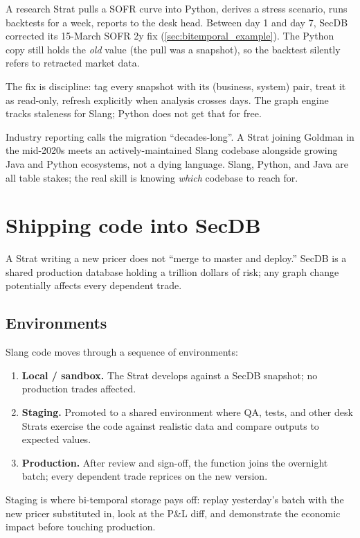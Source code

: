 \begin{pitfallbox}
A research Strat pulls a SOFR curve into Python, derives a stress
scenario, runs backtests for a week, reports to the desk head.
Between day 1 and day 7, SecDB corrected its 15-March SOFR 2y fix
(\cref{sec:bitemporal_example}).  The Python copy still holds the
\emph{old} value (the pull was a snapshot), so the backtest
silently refers to retracted market data.

The fix is discipline: tag every snapshot with its (business,
system) pair, treat it as read-only, refresh explicitly when
analysis crosses days.  The graph engine tracks staleness for
Slang; Python does not get that for free.
\end{pitfallbox}

Industry reporting calls the migration ``decades-long''.  A Strat
joining Goldman in the mid-2020s meets an actively-maintained
Slang codebase alongside growing Java and Python ecosystems, not
a dying language.  Slang, Python, and Java are all table stakes;
the real skill is knowing \emph{which} codebase to reach for.


\section{Shipping code into SecDB}
\label{sec:shipping}

A Strat writing a new pricer does not ``merge to master and
deploy.''  SecDB is a shared production database holding a
trillion dollars of risk; any graph change potentially affects
every dependent trade.

\subsection{Environments}

Slang code moves through a sequence of environments:
\begin{enumerate}
  \item \textbf{Local / sandbox.}  The Strat develops against a
    SecDB snapshot; no production trades affected.
  \item \textbf{Staging.}  Promoted to a shared environment where
    QA, tests, and other desk Strats exercise the code against
    realistic data and compare outputs to expected values.
  \item \textbf{Production.}  After review and sign-off, the
    function joins the overnight batch; every dependent trade
    reprices on the new version.
\end{enumerate}
Staging is where bi-temporal storage pays off: replay yesterday's
batch with the new pricer substituted in, look at the P\&L diff,
and demonstrate the economic impact before touching production.

